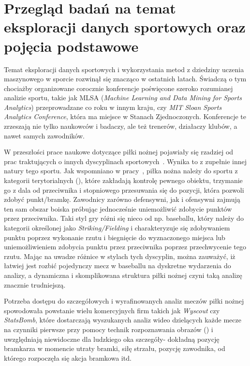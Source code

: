 
\chapter{Przegląd badań na temat eksploracji danych sportowych oraz pojęcia podstawowe}
Temat eksploracji danych sportowych i wykorzystania metod z dziedziny uczenia maszynowego w sporcie rozwinął się znacząco w ostatnich latach. Świadczą o tym chociażby organizowane corocznie konferencje poświęcone szeroko rozumianej analizie sportu, takie jak MLSA (\textit{Machine Learning and Data Mining for Sports Analytics}) przeprowadzane co roku w innym kraju, czy \textit{MIT Sloan Sports Analytics Conference}, która ma miejsce w Stanach Zjednoczonych. Konferencje te zrzeszają nie tylko naukowców i badaczy, ale też trenerów, działaczy klubów, a nawet samych zawodników.

W przeszłości prace naukowe dotyczące piłki nożnej pojawiały się rzadziej od prac traktujących o innych dyscyplinach sportowych~\cite{ml_soccer_analytics}. Wynika to z zupełnie innej natury tego sportu. Jak wspomniano w pracy~\cite{game_classification}, piłka nożna należy do sportu z kategorii terytorialnych (), które zakładają kontrolę pewnego obiektu, trzymanie go z dala od przeciwnika i stopniowego przesuwania się do pozycji, która pozwoli zdobyć punkt/bramkę. Zawodnicy zarówno defensywni, jak i ofensywni zajmują ten sam obszar boiska próbując jednocześnie uniemożliwić zdobycie punktów przez przeciwnika. Taki styl gry różni się nieco od np. baseballu, który należy do kategorii określonej jako \textit{Striking/Fielding} i charakteryzuje się zdobywaniem punktu poprzez wykonanie rzutu i biegnięcie do wyznaczonego miejsca lub uniemożliwieniem zdobycia punktu przez przeciwnika poprzez przechwycenie tego rzutu. Mając na uwadze różnice w stylach tych dyscyplin, można zauważyć, iż łatwiej jest rozbić pojedynczy mecz w baseballu na dyskretne wydarzenia do analizy, a dynamiczna i skomplikowana struktura piłki nożnej czyni taką analizę znacznie trudniejszą.

Potrzeba dostępu do szczegółowych i wyrafinowanych analiz meczów piłki nożnej spowodowała powstanie wielu komercyjnych firm takich jak \textit{Wyscout} czy \textit{StatsBomb}, które dostarczają wyszukanych analiz wideo dzielących każde mecze na czynniki pierwsze przy pomocy technik rozpoznawania obrazów () i uwzględniają niewidoczne dla ludzkiego oka szczegóły- dokładną pozycję bramkarza w momencie utraty bramki, siłę strzału, pozycję zawodnika, od którego rozpoczęła się akcja bramkowa itd.

